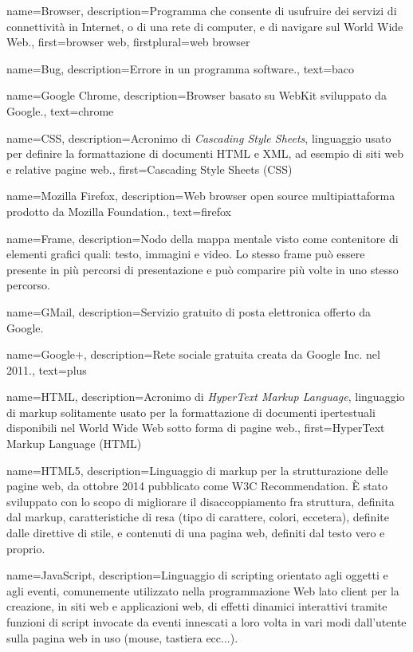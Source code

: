 {
name={Browser},
description={Programma che consente di usufruire dei servizi di connettività in Internet, o di una rete di computer, e di navigare sul World Wide Web.},
first={browser web},
firstplural={web browser}
}

{
name={Bug},
description={Errore in un programma software.},
text={baco}
}

{
name={Google Chrome},
description={Browser basato su WebKit sviluppato da Google.},
text={chrome}
}



{
name={CSS},
description={Acronimo di \textit{Cascading Style Sheets}, linguaggio usato per definire la formattazione di documenti HTML e XML, ad esempio di siti web e relative pagine web.},
first={Cascading Style Sheets (CSS)}
}

{
name={Mozilla Firefox},
description={Web browser open source multipiattaforma prodotto da Mozilla Foundation.},
text={firefox}
}

{
name={Frame},
description={Nodo della mappa mentale visto come contenitore di elementi grafici quali: testo, immagini e video. Lo stesso frame può essere presente in più percorsi di presentazione e può comparire più volte in uno stesso percorso.}
}


{
name={GMail},
description={Servizio gratuito di posta elettronica offerto da Google.}
}

{
name={Google+},
description={Rete sociale gratuita creata da Google Inc. nel 2011.},
text={plus}
}

{
name={HTML},
description={Acronimo di \textit{HyperText Markup Language}, linguaggio di markup solitamente usato per la formattazione di documenti ipertestuali disponibili nel World Wide Web sotto forma di pagine web.},
first={HyperText Markup Language (HTML)}
}

{
name={HTML5},
description={Linguaggio di markup per la strutturazione delle pagine web, da ottobre 2014 pubblicato come W3C Recommendation. \`{E} stato sviluppato con lo scopo di migliorare il disaccoppiamento fra struttura, definita dal markup, caratteristiche di resa (tipo di carattere, colori, eccetera), definite dalle direttive di stile, e contenuti di una pagina web, definiti dal testo vero e proprio.}
}

{
name={JavaScript},
description={Linguaggio di scripting orientato agli oggetti e agli eventi, comunemente utilizzato nella programmazione Web lato client per la creazione, in siti web e applicazioni web, di effetti dinamici interattivi tramite funzioni di script invocate da eventi innescati a loro volta in vari modi dall'utente sulla pagina web in uso (mouse, tastiera ecc...).}
}

